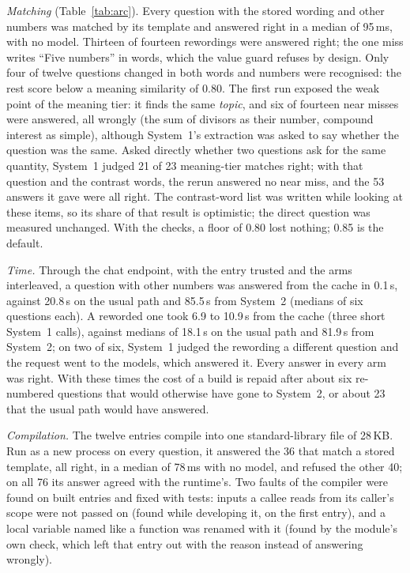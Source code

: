 \emph{Matching} (Table~\ref{tab:arc}). Every question with the stored wording
and other numbers was matched by its template and answered right in a median
of 95\,ms, with no model. Thirteen of fourteen rewordings were answered right;
the one miss writes ``Five numbers'' in words, which the value guard refuses
by design. Only four of twelve questions changed in both words and numbers
were recognised: the rest score below a meaning similarity of 0.80. The first
run exposed the weak point of the meaning tier: it finds the same \emph{topic},
and six of fourteen near misses were answered, all wrongly (the sum of
divisors as their number, compound interest as simple), although System~1's
extraction was asked to say whether the question was the same. Asked directly
whether two questions ask for the same quantity, System~1 judged 21 of 23
meaning-tier matches right; with that question and the contrast words, the
rerun answered no near miss, and the 53 answers it gave were all right. The
contrast-word list was written while looking at these items, so its share of
that result is optimistic; the direct question was measured unchanged. With
the checks, a floor of 0.80 lost nothing; 0.85 is the default.

\emph{Time.} Through the chat endpoint, with the entry trusted and the arms
interleaved, a question with other numbers was answered from the cache in
0.1\,s, against 20.8\,s on the usual path and 85.5\,s from
System~2 (medians of six questions each). A reworded one took 6.9 to 10.9\,s from the
cache (three short System~1 calls), against medians of 18.1\,s on the usual
path and 81.9\,s from System~2; on two of six, System~1 judged the rewording a
different question and the request went to the models, which answered it.
Every answer in every arm was right. With these times the cost of a build is
repaid after about six re-numbered questions that would otherwise have
gone to System~2, or about 23 that the usual path would have answered.

\emph{Compilation.} The twelve entries compile into one standard-library file of 28\,KB. Run as a new process on every question, it answered the 36 that match a stored template, all right, in a median of 78\,ms with no model, and refused the other 40; on all 76 its answer agreed with the runtime's. Two faults of the compiler were found on built entries and fixed with tests: inputs a callee reads from its caller's scope were not passed on (found while developing it, on the first entry), and a local variable named like a function was renamed with it (found by the module's own check, which left that entry out with the reason instead of answering wrongly).
